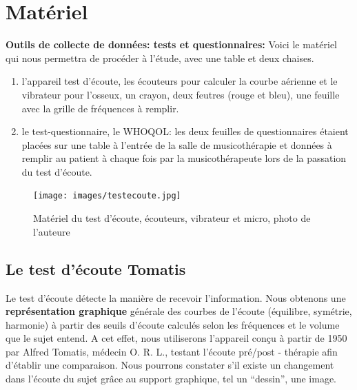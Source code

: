 \section{Matériel}
\textbf{Outils de collecte de données: tests et questionnaires: }
Voici le matériel qui nous permettra de procéder à l'étude, avec une table et deux chaises.
\begin{enumerate}
	\item l'appareil
	test d'écoute, les écouteurs pour calculer la courbe  aérienne et le vibrateur pour l'osseux, un crayon, 
	deux
	feutres (rouge et bleu), une feuille avec la grille de fréquences à
	remplir.

	\item le test-questionnaire, le WHOQOL: 
les deux feuilles de questionnaires étaient placées sur une table à l'entrée de la salle de musicothérapie 
et données à remplir au patient à chaque fois par la musicothérapeute lors de la passation du test 
d'écoute. 
\end{enumerate}
\begin{figure}
	\centering
	\texttt{[image: images/testecoute.jpg]}
	\caption[Appareil test écoute Tomatis ]{Matériel du test d'écoute, écouteurs, vibrateur et micro, photo 
	de 
	l'auteure}
	
	\label{appareiltestecoute}
\end{figure}

\subsection *{Le test d'écoute Tomatis}
Le test d'écoute détecte la manière de recevoir
l'information.
Nous obtenons une
\textbf{représentation graphique} générale des courbes de l'écoute
(équilibre, symétrie, harmonie) à partir des seuils d'écoute
calculés selon les fréquences et le volume que le sujet entend.
A cet effet, nous utiliserons l'appareil conçu à partir de 1950 par Alfred Tomatis, médecin
O. R. L., testant
l'écoute pré/post - thérapie
afin d'établir une comparaison.
Nous pourrons constater
s'il existe un changement dans l'écoute du sujet grâce au support graphique, tel un ``dessin'',
une image. %


